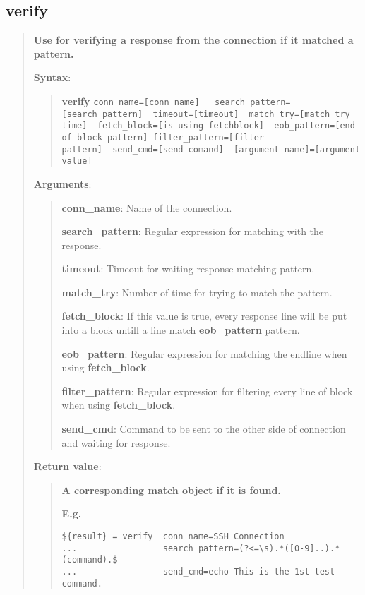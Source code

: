 \hypertarget{description-verify}{%
\subsection{\texorpdfstring{\textbf{verify}}{verify}}\label{description-verify}}

\begin{quote}
\textbf{Use for verifying a response from the connection if it matched a pattern.}

\textbf{Syntax}:

\begin{quote}
\textbf{verify}
\texttt{conn\_name={[}conn\_name{]}\ \ \ search\_pattern={[}search\_pattern{]}\ \ timeout={[}timeout{]}\ \ match\_try={[}match try time{]}\ \ fetch\_block={[}is using fetchblock{]}\ \ eob\_pattern={[}end of block pattern{]}\ filter\_pattern={[}filter pattern{]}\ \ send\_cmd={[}send comand{]}\ \ {[}argument name{]}={[}argument value{]}}
\end{quote}

\textbf{Arguments}:

\begin{quote}
\textbf{conn\_name}: Name of the connection.

\textbf{search\_pattern}: Regular expression for matching with the response.

\textbf{timeout}: Timeout for waiting response matching pattern.

\textbf{match\_try}: Number of time for trying to match the pattern.

\textbf{fetch\_block}: If this value is true, every response line will be put into a block untill a line match \textbf{eob\_pattern} pattern.

\textbf{eob\_pattern}: Regular expression for matching the endline when using \textbf{fetch\_block}.

\textbf{filter\_pattern}: Regular expression for filtering every line of block when using \textbf{fetch\_block}.

\textbf{send\_cmd}: Command to be sent to the other side of connection and waiting for response.
\end{quote}

\textbf{Return value}:

\begin{quote}
\textbf{A corresponding match object if it is found.}

\textbf{E.g.}

\begin{verbatim}
${result} = verify  conn_name=SSH_Connection
...                 search_pattern=(?<=\s).*([0-9]..).*(command).$
...                 send_cmd=echo This is the 1st test command.
\end{verbatim}


\end{quote}
\end{quote}
